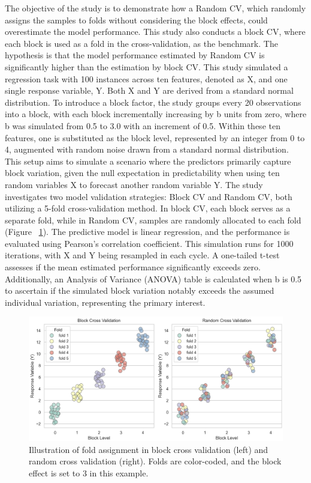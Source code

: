 The objective of the study is to demonstrate how a Random CV, which randomly assigns the samples to folds without considering the block effects, could overestimate the model performance. This study also conducts a block CV, where each block is used as a fold in the cross-validation, as the benchmark. The hypothesis is that the model performance estimated by Random CV is significantly higher than the estimation by block CV. This study simulated a regression task with 100 instances across ten features, denoted as X, and one single response variable, Y. Both X and Y are derived from a standard normal distribution. To introduce a block factor, the study groups every 20 observations into a block, with each block incrementally increasing by b units from zero, where b was simulated from 0.5 to 3.0 with an increment of 0.5. Within these ten features, one is substituted as the block level, represented by an integer from 0 to 4, augmented with random noise drawn from a standard normal distribution. This setup aims to simulate a scenario where the predictors primarily capture block variation, given the null expectation in predictability when using ten random variables X to forecast another random variable Y.
The study investigates two model validation strategies: Block CV and Random CV, both utilizing a 5-fold cross-validation method. In block CV, each block serves as a separate fold, while in Random CV, samples are randomly allocated to each fold (Figure ~\ref{fig:s3_block}). The predictive model is linear regression, and the performance is evaluated using Pearson's correlation coefficient. This simulation runs for 1000 iterations, with X and Y being resampled in each cycle. A one-tailed t-test assesses if the mean estimated performance significantly exceeds zero. Additionally, an Analysis of Variance (ANOVA) table is calculated when b is 0.5 to ascertain if the simulated block variation notably exceeds the assumed individual variation, representing the primary interest.

\begin{figure}[h]
    \centering
    \includegraphics[width=1\textwidth]{fig_s3_block.jpg}
    \caption{Illustration of fold assignment in block cross validation (left) and random cross validation (right). Folds are color-coded, and the block effect is set to 3 in this example.}
    \label{fig:s3_block}
\end{figure}

